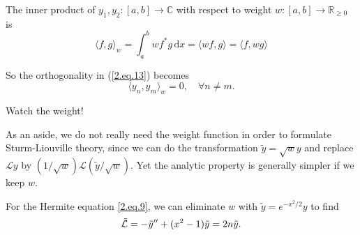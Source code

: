 \documentclass[a4paper]{article}
\begin{document}
\begin{definition}
    The inner product of $y_1,y_2:[a,b]\to\mathbb C$ with respect to weight $w:[a,b]\to\mathbb R_{\ge 0}$ is
    \begin{equation}
        \langle f,g\rangle_w=\int_a^bwf^*g\,\mathrm dx=\langle wf,g\rangle=\langle f,wg\rangle
    \end{equation}
\end{definition}

So the orthogonality in (\ref{2.eq.13}) becomes 
\begin{equation}
    \langle y_n,y_m \rangle _w = 0,\quad \forall n\neq m.
\end{equation}

\begin{remark}
    Watch the weight!
\end{remark}

As an aside, we do not really need the weight function in order to formulate Sturm-Liouville theory, since we can do the transformation $\tilde{y}=\sqrt{w}y$ and replace $\mathcal Ly$ by $(1/\sqrt{w})\mathcal L(\tilde{y}/\sqrt{w})$.
Yet the analytic property is generally simpler if we keep $w$.
\begin{example}
    For the Hermite equation \ref{2.eq.9}, we can eliminate $ w $ with $ \tilde{y}=e^{-x^2/2}y $ to find 
    \[
        \tilde{{\mathcal{L}}} = -\tilde{y}''+(x^2-1)\tilde{y}=2n \tilde{y}.
    \]
\end{example}
\end{document}
